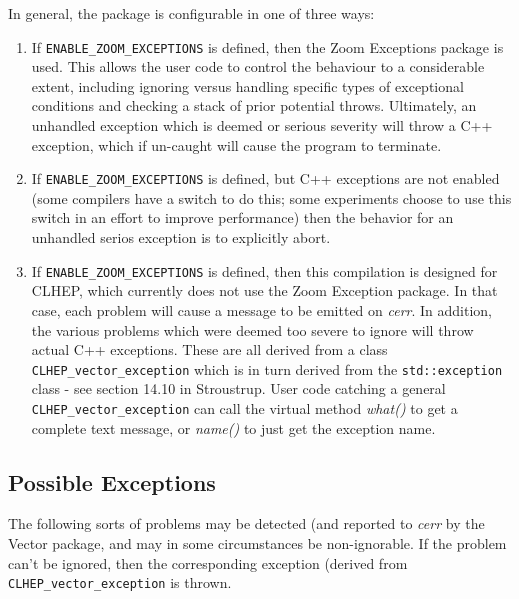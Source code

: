 \documentclass[twoside,12pt]{article}
\begin{document}
In general, the package is configurable in one of three ways:
\begin{enumerate}
\item
If {\tt ENABLE\_ZOOM\_EXCEPTIONS} is defined, then the Zoom Exceptions
package is used.  This allows the user code to control the behaviour to 
a considerable extent, including ignoring versus handling specific types
of exceptional conditions and checking a stack of prior potential throws.
Ultimately, an unhandled exception which is deemed or serious severity will
throw a C++ exception, which if un-caught will cause the program to terminate.
\item
If {\tt ENABLE\_ZOOM\_EXCEPTIONS} is defined, but C++ exceptions are not
enabled (some compilers have a switch to do this; some experiments choose
to use this switch in an effort to improve performance) then the behavior
for an unhandled serios exception is to explicitly abort.
\item
If {\tt ENABLE\_ZOOM\_EXCEPTIONS} is defined, then this compilation is designed
for CLHEP, which currently does not use the Zoom Exception package.
In that case, each problem will cause a message to be emitted on {\em cerr}.
In addition, the various problems which were deemed too severe to
ignore will throw actual C++ exceptions.  These are all derived from
a class {\tt CLHEP\_vector\_exception} which is in turn derived from 
the {\tt std::exception} class - see section 14.10 in Stroustrup.  
User code catching a general {\tt CLHEP\_vector\_exception} can call the
virtual method {\em what()} to get a complete text message, or {\em name()}
to just get the exception name.  
\end{enumerate}

\subsection{Possible Exceptions}

The following sorts of problems may be detected (and reported to {\em cerr}
by the Vector package,
and may in some circumstances be non-ignorable.  
If the problem can't be ignored, then the corresponding exception 
(derived from {\tt CLHEP\_vector\_exception} is thrown.
\end{document}
